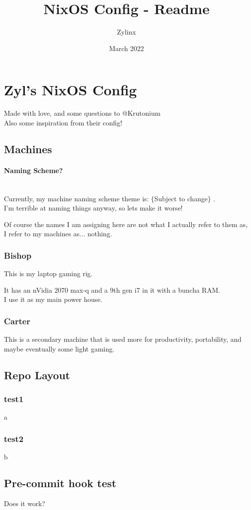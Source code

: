 \documentclass{article}
\title{NixOS Config - Readme}
\author{Zylinx}
\date{March 2022}
\begin{document}
\section{Zyl's NixOS Config}
Made with love, and some questions to @Krutonium\\
Also some inspiration from their config!

\tableofcontents

\subsection{Machines}
\paragraph{Naming Scheme?}\mbox{}\\
Currently, my machine naming scheme theme is: $\{$Subject to change$\}$ .\\
I'm terrible at naming things anyway, so lets make it worse!

Of course the names I am assigning here are not what I actually refer to them as, I refer to my machines as... nothing.

\subsubsection{Bishop}
This is my laptop gaming rig.

It has an nVidia 2070 max-q and a 9th gen i7 in it with a buncha RAM.\\
I use it as my main power house.

\subsubsection{Carter}
This is a secondary machine that is used more for productivity, portability, and maybe eventually some light gaming.

\subsection{Repo Layout}
\subsubsection{test1}
a

\subsubsection{test2}
b

\subsection{Pre-commit hook test}
Does it work?
\end{document}
